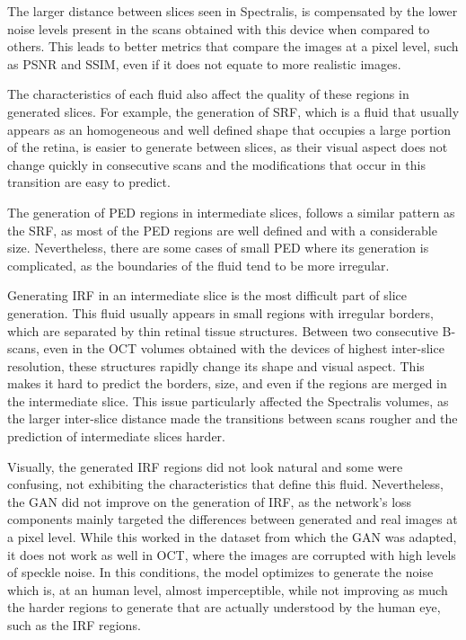 \par
The larger distance between slices seen in Spectralis, is compensated by the lower noise levels present in the scans obtained with this device when compared to others. This leads to better metrics that compare the images at a pixel level, such as PSNR and SSIM, even if it does not equate to more realistic images.
\par
The characteristics of each fluid also affect the quality of these regions in generated slices. For example, the generation of SRF, which is a fluid that usually appears as an homogeneous and well defined shape that occupies a large portion of the retina, is easier to generate between slices, as their visual aspect does not change quickly in consecutive scans and the modifications that occur in this transition are easy to predict.
\par
The generation of PED regions in intermediate slices, follows a similar pattern as the SRF, as most of the PED regions are well defined and with a considerable size. Nevertheless, there are some cases of small PED where its generation is complicated, as the boundaries of the fluid tend to be more irregular.
\par
Generating IRF in an intermediate slice is the most difficult part of slice generation. This fluid usually appears in small regions with irregular borders, which are separated by thin retinal tissue structures. Between two consecutive B-scans, even in the OCT volumes obtained with the devices of highest inter-slice resolution, these structures rapidly change its shape and visual aspect. This makes it hard to predict the borders, size, and even if the regions are merged in the intermediate slice. This issue particularly affected the Spectralis volumes, as the larger inter-slice distance made the transitions between scans rougher and the prediction of intermediate slices harder.
\par
Visually, the generated IRF regions did not look natural and some were confusing, not exhibiting the characteristics that define this fluid. Nevertheless, the GAN did not improve on the generation of IRF, as the network's loss components mainly targeted the differences between generated and real images at a pixel level. While this worked in the dataset from which the GAN was adapted, it does not work as well in OCT, where the images are corrupted with high levels of speckle noise. In this conditions, the model optimizes to generate the noise which is, at an human level, almost imperceptible, while not improving as much the harder regions to generate that are actually understood by the human eye, such as the IRF regions.
